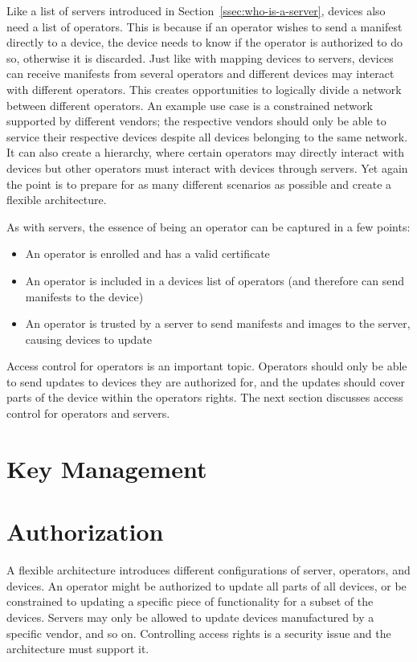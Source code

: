 \documentclass[0-thesis.tex]{subfiles}
\begin{document}
Like a list of servers introduced in Section~\ref{ssec:who-is-a-server}, devices also need
a list of operators. This is because if an operator wishes to send a manifest directly to
a device, the device needs to know if the operator is authorized to do so, otherwise it is
discarded. Just like with mapping devices to servers, devices can receive manifests from
several operators and different devices may interact with different operators. This
creates opportunities to logically divide a network between different operators. An
example use case is a constrained network supported by different vendors; the respective
vendors should only be able to service their respective devices despite all devices
belonging to the same network. It can also create a hierarchy, where certain operators may
directly interact with devices but other operators must interact with devices through
servers. Yet again the point is to prepare for as many different scenarios as possible and
create a flexible architecture.

As with servers, the essence of being an operator can be captured in a few points:

\begin{itemize}
    \item An operator is enrolled and has a valid certificate
    \item An operator is included in a devices list of operators (and therefore can send
            manifests to the device)
    \item An operator is trusted by a server to send manifests and images to the server,
            causing devices to update
\end{itemize}

Access control for operators is an important topic. Operators should only be able to send
updates to devices they are authorized for, and the updates should cover parts of the
device within the operators rights. The next section discusses access control for
operators and servers.

\section{Key Management}
\label{sec:key-management}


\section{Authorization}
\label{sec:authorization}
A flexible architecture introduces different configurations of server, operators, and
devices. An operator might be authorized to update all parts of all devices, or be
constrained to updating a specific piece of functionality for a subset of the devices.
Servers may only be allowed to update devices manufactured by a specific vendor, and so
on. Controlling access rights is a security issue and the architecture must support it.
\end{document}
